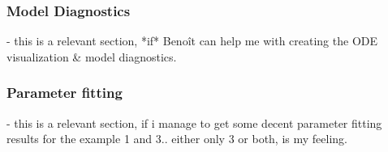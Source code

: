 \documentclass[journal abbreviation, manuscript]{copernicus}
\begin{document}
\subsubsection{Model Diagnostics}
- this is a relevant section, *if* Benoît can help me with creating the ODE visualization & model diagnostics.

\subsubsection{Parameter fitting}
- this is a relevant section, if i manage to get some decent parameter fitting results for the example 1 and 3.. either only 3 or both, is my feeling. 
\end{document}
